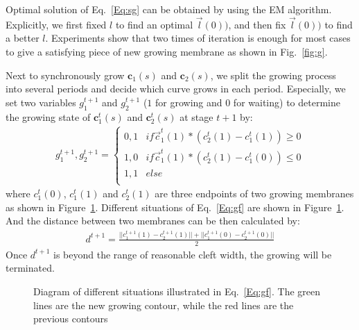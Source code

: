 Optimal solution of Eq.~\ref{Eq:sg} can be obtained by using the EM algorithm.
Explicitly, we first fixed $l$ to find an optimal $\overrightarrow{l}(0))$, and then fix $\overrightarrow{l}(0))$ to find a better $l$.
Experiments show that two times of iteration is enough for most cases to give a satisfying piece of new growing membrane as shown in Fig.~\ref{fig:g}.

Next to synchronously grow $\mathbf{c}_1(s)$ and $\mathbf{c}_2(s)$, we split the growing process into several periods and decide which curve grows in each period.
Especially, we set two variables $g_1^{t+1}$ and $g_2^{t+1}$  ($1$ for growing and $0$ for waiting) to determine the growing state of $\mathbf{c}_1^{t}(s)$ and $\mathbf{c}_2^{t}(s)$ at stage $t+1$ by:
\begin{eqnarray}\label{Eq:gf}
g_1^{t+1},g_2^{t+1} = \left\{\begin{array}{cc}
0,1&if \overrightarrow{c}^t_1(1)*(c_2^t(1)-c_1^t(1))\geq 0 \\
1,0&if \overrightarrow{c}^t_1(1)*(c_2^t(1)-c_1^t(0))\leq 0\\
1,1& else\\
\end{array}\right.
\end{eqnarray}
where $c_1^t(0)$, $c_1^t(1)$ and $c_2^t(1)$ are three endpoints of two growing membranes as shown in Figure~\ref{fig:sg}.
Different situations of Eq.~\ref{Eq:gf} are shown in Figure~\ref{fig:sg}.
And the distance between two membranes can be then calculated by:
\begin{eqnarray}\label{Eq:d}
d^{t+1} = \frac{||c_1^{t+1}(1)-c_2^{t+1}(1)||+ ||c_1^{t+1}(0)-c_2^{t+1}(0)||}{2}
\end{eqnarray}
Once $d^{t+1}$ is beyond the range of reasonable cleft width, the growing will be terminated.
\begin{figure}[t]
\begin{minipage}[b]{1.0\linewidth}
  \centering
 \centerline{}
\end{minipage}
\caption{Diagram of different situations illustrated in Eq.~\ref{Eq:gf}.
        The green lines are the new growing contour, while the red lines are the previous contours}
\label{fig:sg}
\end{figure}
